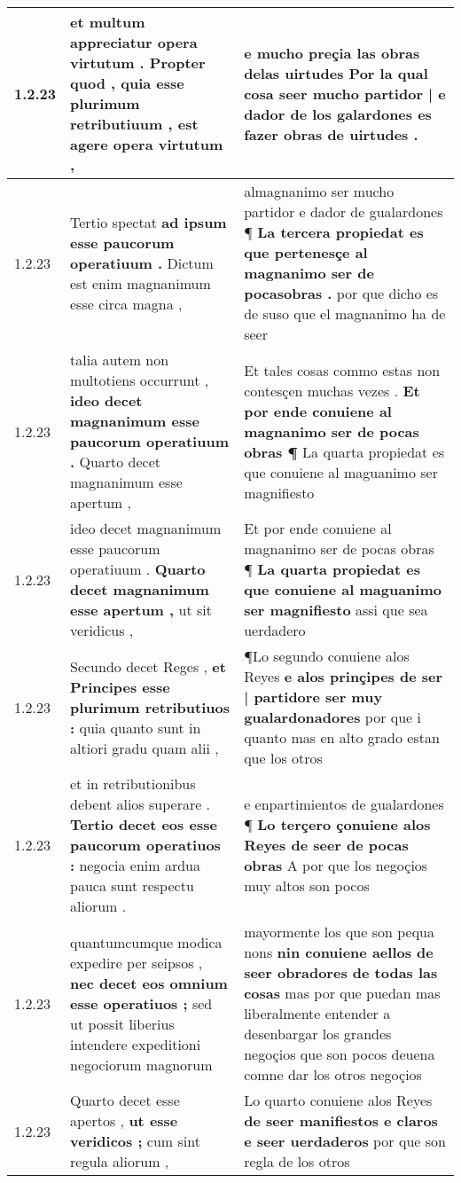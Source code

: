 \begin{tabular}{|p{1cm}|p{6.5cm}|p{6.5cm}|}
1.2.23 & et multum appreciatur opera virtutum . \textbf{ Propter quod , quia esse plurimum retributiuum , } est agere opera virtutum , & e mucho preçia las obras delas uirtudes \textbf{ Por la qual cosa seer mucho partidor | e dador de los galardones } es fazer obras de uirtudes . \\\hline
1.2.23 & Tertio spectat \textbf{ ad ipsum esse paucorum operatiuum . } Dictum est enim magnanimum esse circa magna , & almagnanimo ser mucho partidor e dador de gualardones ¶ \textbf{ La tercera propiedat es que pertenesçe al magnanimo ser de pocasobras . } por que dicho es de suso que el magnanimo ha de seer \\\hline
1.2.23 & talia autem non multotiens occurrunt , \textbf{ ideo decet magnanimum esse paucorum operatiuum . } Quarto decet magnanimum esse apertum , & Et tales cosas commo estas non contesçen muchas vezes . \textbf{ Et por ende conuiene al magnanimo ser de pocas obras ¶ } La quarta propiedat es que conuiene al maguanimo ser magnifiesto \\\hline
1.2.23 & ideo decet magnanimum esse paucorum operatiuum . \textbf{ Quarto decet magnanimum esse apertum , } ut sit veridicus , & Et por ende conuiene al magnanimo ser de pocas obras ¶ \textbf{ La quarta propiedat es que conuiene al maguanimo ser magnifiesto } assi que sea uerdadero \\\hline
1.2.23 & Secundo decet Reges , \textbf{ et Principes esse plurimum retributiuos : } quia quanto sunt in altiori gradu quam alii , & ¶Lo segundo conuiene alos Reyes \textbf{ e alos prinçipes de ser | partidore ser muy gualardonadores } por que i quanto mas en alto grado estan que los otros \\\hline
1.2.23 & et in retributionibus debent alios superare . \textbf{ Tertio decet eos esse paucorum operatiuos : } negocia enim ardua pauca sunt respectu aliorum . & e enpartimientos de gualardones ¶ \textbf{ Lo terçero çonuiene alos Reyes de seer de pocas obras } A por que los negoçios muy altos son pocos \\\hline
1.2.23 & quantumcumque modica expedire per seipsos , \textbf{ nec decet eos omnium esse operatiuos ; } sed ut possit liberius intendere expeditioni negociorum magnorum & mayormente los que son pequa nons \textbf{ nin conuiene aellos de seer obradores de todas las cosas } mas por que puedan mas liberalmente entender a desenbargar los grandes negoçios que son pocos deuena comne dar los otros negoçios \\\hline
1.2.23 & Quarto decet esse apertos , \textbf{ ut esse veridicos ; } cum sint regula aliorum , & Lo quarto conuiene alos Reyes \textbf{ de seer manifiestos e claros e seer uerdaderos } por que son regla de los otros \\\hline

\end{tabular}
